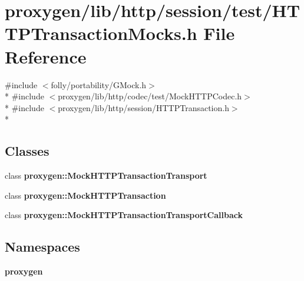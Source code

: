 \section{proxygen/lib/http/session/test/\+H\+T\+T\+P\+Transaction\+Mocks.h File Reference}
\label{HTTPTransactionMocks_8h}
{\ttfamily \#include $<$folly/portability/\+G\+Mock.\+h$>$}\\*
{\ttfamily \#include $<$proxygen/lib/http/codec/test/\+Mock\+H\+T\+T\+P\+Codec.\+h$>$}\\*
{\ttfamily \#include $<$proxygen/lib/http/session/\+H\+T\+T\+P\+Transaction.\+h$>$}\\*
\subsection*{Classes}
\begin{DoxyCompactItemize}
\item 
class {\bf proxygen\+::\+Mock\+H\+T\+T\+P\+Transaction\+Transport}
\item 
class {\bf proxygen\+::\+Mock\+H\+T\+T\+P\+Transaction}
\item 
class {\bf proxygen\+::\+Mock\+H\+T\+T\+P\+Transaction\+Transport\+Callback}
\end{DoxyCompactItemize}
\subsection*{Namespaces}
\begin{DoxyCompactItemize}
\item 
 {\bf proxygen}
\end{DoxyCompactItemize}
